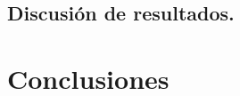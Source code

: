 \documentclass[11pt,letterpaper]{report}
\begin{document}
								
	\section{Discusión de resultados.}


\chapter{Conclusiones}





	

 
	\renewcommand{\refname}{Bibliografía} %

	 




	
\end{document}
